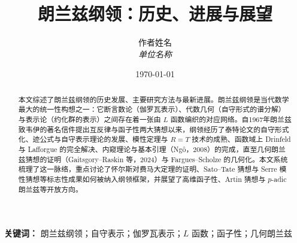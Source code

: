 \documentclass[12pt,a4paper]{article}
\title{朗兰兹纲领：历史、进展与展望}
\author{
    作者姓名\\
    \textit{单位名称}
}
\date{\today}
\numberwithin{equation}{section}
\begin{document}
\maketitle

\begin{abstract}
    本文综述了朗兰兹纲领的历史发展、主要研究方法与最新进展。朗兰兹纲领是当代数学最大的统一性构想之一：它断言数论（伽罗瓦表示）、代数几何（自守形式的谱分解）与表示论（约化群的表示）之间存在着一张由 $L$ 函数编织的对应网络。自1967年朗兰兹致韦伊的著名信件提出互反律与函子性两大猜想以来，纲领经历了泰特论文的自守形式化、迹公式与自守表示理论的发展、模性定理与 $R=T$ 技术的成熟、函数域上 Drinfeld 与 Lafforgue 的完全解决、内窥理论与基本引理（Ng\^o，2008）的完成，直至几何朗兰兹猜想的证明（Gaitsgory--Raskin 等，2024）与 Fargues--Scholze 的几何化。本文系统梳理了这一脉络，重点讨论了怀尔斯对费马大定理的证明、Sato--Tate 猜想与 Serre 模性猜想等标志性成果如何被纳入纲领框架，并展望了高维函子性、Artin 猜想与 $p$-adic 朗兰兹等开放方向。
\end{abstract}

\textbf{关键词：} 朗兰兹纲领；自守表示；伽罗瓦表示；$L$ 函数；函子性；几何朗兰兹

\tableofcontents
\newpage












\appendix

\end{document}
